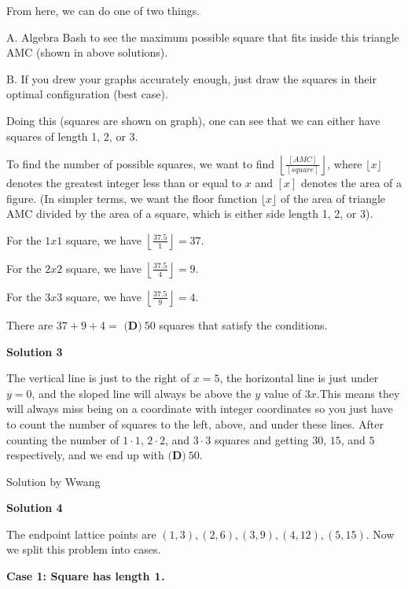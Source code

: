 \begin{enumerate}
 From here, we can do one of two things.

 A. Algebra Bash to see the maximum possible square that fits inside this triangle AMC (shown in above solutions).

 B. If you drew your graphs accurately enough, just draw the squares in their optimal configuration (best case).

 Doing this (squares are shown on graph), one can see that we can either have squares of length 1, 2, or 3.

 To find the number of possible squares, we want to find $\left\lfloor \frac{[AMC]}{[square]} \right\rfloor$, where $\lfloor x \rfloor$ denotes the greatest integer less than or equal to $x$ and $[x]$ denotes the area of a figure. (In simpler terms, we want the floor function $\lfloor x \rfloor$ of the area of triangle AMC divided by the area of a square, which is either side length 1, 2, or 3).

 For the $1x1$ square, we have $\left\lfloor \frac{37.5}{1} \right\rfloor = 37$.

 For the $2x2$ square, we have $\left\lfloor \frac{37.5}{4} \right\rfloor = 9$.

 For the $3x3$ square, we have $\left\lfloor \frac{37.5}{9} \right\rfloor = 4$.

 There are $37 + 9 + 4 =$ $\boxed{\textbf{(D)}\ 50}$ squares that satisfy the conditions.

 


 



\textbf{Solution 3}

The vertical line is just to the right of $x = 5$, the horizontal line is just under $y = 0$, and the sloped line will always be above the $y$ value of $3x$.This means they will always miss being on a coordinate with integer coordinates so you just have to count the number of squares to the left, above, and under these lines. After counting the number of $1\cdot1$, $2\cdot2$, and $3\cdot3$ squares and getting $30$, $15$, and $5$ respectively, and we end up with $\boxed{\textbf{(D)}\ 50}$.

 Solution by Wwang

 



\textbf{Solution 4}

The endpoint lattice points are $(1,3), (2,6), (3,9), (4,12), (5,15).$ Now we split this problem into cases.

 \textbf{Case 1: Square has length $\textbf1$.}


\end{enumerate}
